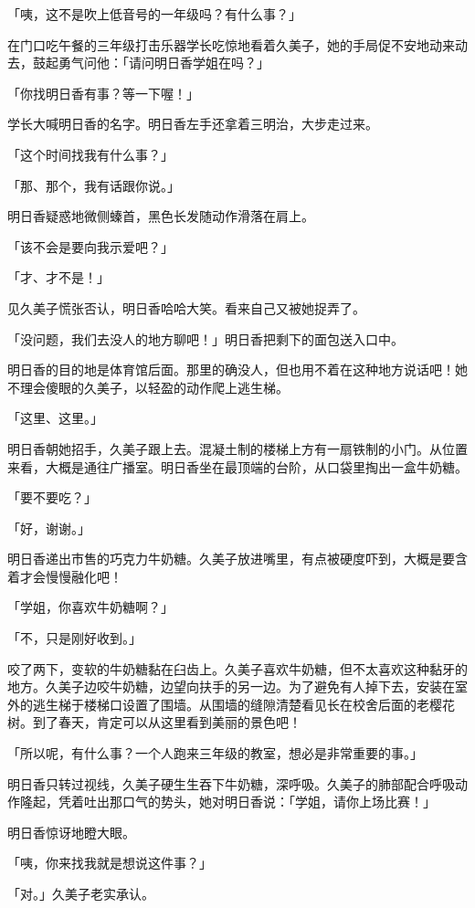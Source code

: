 \documentclass[UTF8]{ctexart}
\begin{document}
    「咦，这不是吹上低音号的一年级吗？有什么事？」 

    在门口吃午餐的三年级打击乐器学长吃惊地看着久美子，她的手局促不安地动来动去，鼓起勇气问他：「请问明日香学姐在吗？」 

    「你找明日香有事？等一下喔！」 

    学长大喊明日香的名字。明日香左手还拿着三明治，大步走过来。 

    「这个时间找我有什么事？」 

    「那、那个，我有话跟你说。」 

    明日香疑惑地微侧螓首，黑色长发随动作滑落在肩上。 

    「该不会是要向我示爱吧？」 

    「才、才不是！」 

    见久美子慌张否认，明日香哈哈大笑。看来自己又被她捉弄了。 

    「没问题，我们去没人的地方聊吧！」明日香把剩下的面包送入口中。 

    明日香的目的地是体育馆后面。那里的确没人，但也用不着在这种地方说话吧！她不理会傻眼的久美子，以轻盈的动作爬上逃生梯。 

    「这里、这里。」 

    明日香朝她招手，久美子跟上去。混凝土制的楼梯上方有一扇铁制的小门。从位置来看，大概是通往广播室。明日香坐在最顶端的台阶，从口袋里掏出一盒牛奶糖。 

    「要不要吃？」 

    「好，谢谢。」 

    明日香递出市售的巧克力牛奶糖。久美子放进嘴里，有点被硬度吓到，大概是要含着才会慢慢融化吧！ 

    「学姐，你喜欢牛奶糖啊？」 

    「不，只是刚好收到。」 

    咬了两下，变软的牛奶糖黏在臼齿上。久美子喜欢牛奶糖，但不太喜欢这种黏牙的地方。久美子边咬牛奶糖，边望向扶手的另一边。为了避免有人掉下去，安装在室外的逃生梯于楼梯口设置了围墙。从围墙的缝隙清楚看见长在校舍后面的老樱花树。到了春天，肯定可以从这里看到美丽的景色吧！ 

    「所以呢，有什么事？一个人跑来三年级的教室，想必是非常重要的事。」 

    明日香只转过视线，久美子硬生生吞下牛奶糖，深呼吸。久美子的肺部配合呼吸动作隆起，凭着吐出那口气的势头，她对明日香说：「学姐，请你上场比赛！」 

    明日香惊讶地瞪大眼。 

    「咦，你来找我就是想说这件事？」 

    「对。」久美子老实承认。 
\end{document}
